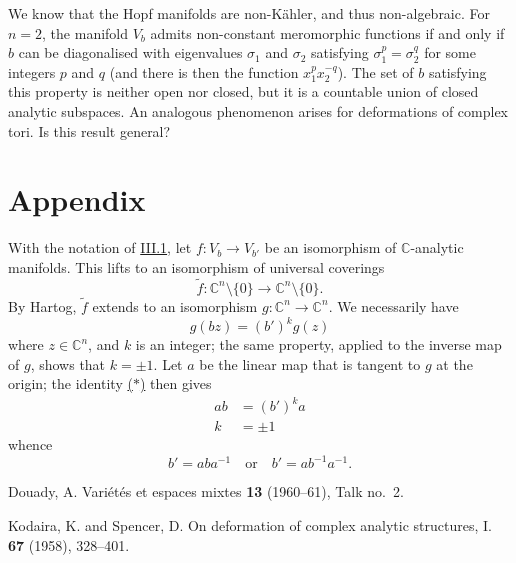\documentclass{article}
\newcommand{\CC}{\mathbb{C}}
\begin{document}
We know that the Hopf manifolds are non-K\"{a}hler, and thus non-algebraic.
For $n=2$, the manifold $V_b$ admits non-constant meromorphic functions if and only if $b$ can be diagonalised with eigenvalues $\sigma_1$ and $\sigma_2$ satisfying $\sigma_1^p=\sigma_2^q$ for some integers $p$ and $q$ (and there is then the function $x_1^px_2^{-q}$).
The set of $b$ satisfying this property is neither open nor closed, but it is a countable union of closed analytic subspaces.
An analogous phenomenon arises for deformations of complex tori.
Is this result general?


\appendix
{}
\section*{Appendix}
\label{appendix}

With the notation of \hyperref[III.1]{III.1}, let $f\colon V_b\to V_{b'}$ be an isomorphism of $\CC$-analytic manifolds.
This lifts to an isomorphism of universal coverings
\[
  \widetilde{f}\colon \CC^n\setminus\{0\} \to \CC^n\setminus\{0\}.
\]
By Hartog, $\widetilde{f}$ extends to an isomorphism $g\colon\CC^n\to\CC^n$.
We necessarily have
\[
\label{*}
  g(bz) = (b')^kg(z)
\tag{$*$}
\]
where $z\in\CC^n$, and $k$ is an integer;
the same property, applied to the inverse map of $g$, shows that $k=\pm1$.
Let $a$ be the linear map that is tangent to $g$ at the origin;
the identity \hyperref[*]{($*$)} then gives
\[
  \begin{aligned}
    ab &= (b')^ka
  \\k &= \pm1
  \end{aligned}
\]
whence
\[
  b' = aba^{-1}
  \quad\text{or}\quad
  b'= ab^{-1}a^{-1}.
\]






\nocite{*}

\begin{thebibliography}{2}

  {Douady, A.}
  \newblock Vari\'{e}t\'{e}s et espaces mixtes
   \textbf{13} (1960--61), Talk no.~2.

  {Kodaira, K. and Spencer, D.}
  \newblock On deformation of complex analytic structures, I.
   \textbf{67} (1958), 328--401.

\end{thebibliography}
\end{document}
